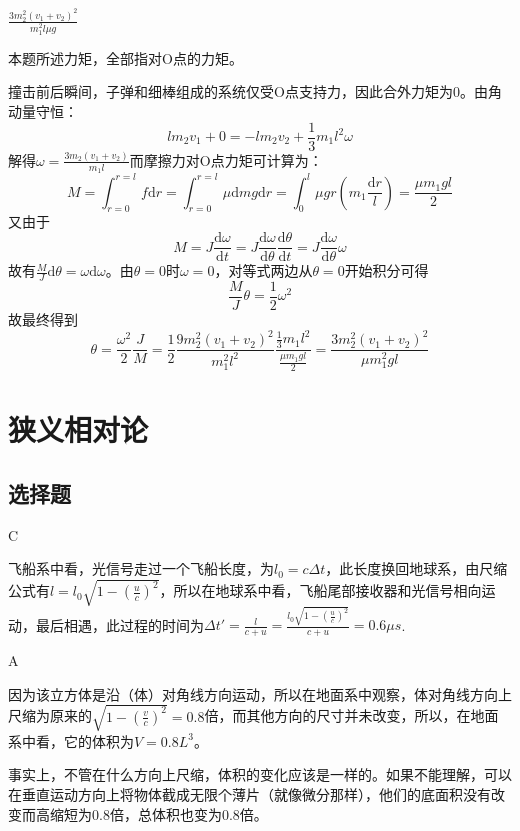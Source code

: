 \documentclass[b5paper,opensource,sourcefont,parskip]{qyxf-book}
\newcommand{\di}[1]{\mathrm{d}#1}
\newcommand{\dy}[2]{\frac{\di{#1}}{\di{#2}}}
\begin{document}
$\frac{3m_2^2(v_1+v_2)^2}{m_1^2l\mu g}$

\solve 本题所述力矩，全部指对O点的力矩。

撞击前后瞬间，子弹和细棒组成的系统仅受O点支持力，因此合外力矩为0。由角动量守恒：
\[lm_2v_1+0=-lm_2v_2+\frac{1}{3}m_1l^2\omega\]
解得$\omega=\frac{3m_2(v_1+v_2)}{m_1l}$而摩擦力对O点力矩可计算为：
\[M=\int_{r=0}^{r=l}f\di{r}=\int_{r=0}^{r=l}\mu \di{m}g\di{r}=\int_0^l\mu gr\left(m_1\frac{\di{r}}{l}\right)=\frac{\mu m_1gl}{2}\]
又由于
\[M=J\dy{\omega}{t}=J\dy{\omega}{\theta}\dy{\theta}{t}=J\dy{\omega}{\theta}\omega\]
故有$\frac{M}{J}\di{\theta}=\omega\di{\omega}$。由$\theta=0$时$\omega=0$，对等式两边从$\theta=0$开始积分可得
\[\frac{M}{J}\theta=\frac{1}{2}\omega^2\]
故最终得到
\[\theta=\frac{\omega^2}{2}\frac{J}{M}=\frac{1}{2}\frac{9m_2^2(v_1+v_2)^2}{m_1^2l^2}\frac{\frac{1}{3}m_1l^2}{\frac{\mu m_1gl}{2}}=\frac{3m_2^2(v_1+v_2)^2}{\mu m_1^2gl}\]

\chapter{狭义相对论}  %
\section{选择题}  %

C  %

\solve
飞船系中看，光信号走过一个飞船长度，为$l_0=c\Delta t$，此长度换回地球系，由尺缩公式有$l=l_0\sqrt{1-\left(\frac{u}{c}\right)^2}$，所以在地球系中看，飞船尾部接收器和光信号相向运动，最后相遇，此过程的时间为$\Delta t'=\frac{l}{c+u}=\frac{l_0\sqrt{1-(\frac{u}{c})^2}}{c+u}=0.6\mu s$.

A

\solve
因为该立方体是沿（体）对角线方向运动，所以在地面系中观察，体对角线方向上尺缩为原来的$\sqrt{1-(\frac{v}{c})^2}=0.8$倍，而其他方向的尺寸并未改变，所以，在地面系中看，它的体积为$V=0.8L^3$。

事实上，不管在什么方向上尺缩，体积的变化应该是一样的。如果不能理解，可以在垂直运动方向上将物体截成无限个薄片（就像微分那样），他们的底面积没有改变而高缩短为0.8倍，总体积也变为0.8倍。
\end{document}
